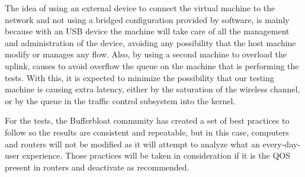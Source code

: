 The idea of using an external device to connect the virtual machine to the 
network and not using a bridged configuration provided by software, is mainly 
because with an USB device the machine will take care of all the management and 
administration of the device, avoiding any possibility that the host machine 
modify or manages any flow. Also, by using a second machine to overload the 
uplink, causes to avoid overflow the queue on the machine that is performing 
the tests. With this, it is expected to minimize the possibility that our 
testing machine is causing extra latency, either by the saturation of the 
wireless channel, or by the queue in the traffic control subsystem into the 
kernel. 

For the tests, the Bufferbloat community\cite{bloat} has created a set of best 
practices\cite{tg12} to follow so the results are consistent and repeatable, 
but in this case, computers and routers will not be modified as it will attempt 
to analyze what an every-day-user experience. Those practices will be taken in 
consideration if it is the QOS present in routers and deactivate as recommended.
 
